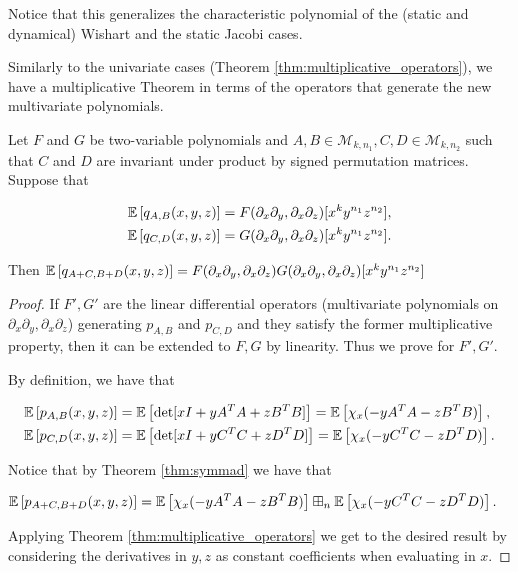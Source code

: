     Notice that this generalizes the characteristic polynomial of the (static and dynamical) Wishart and the static Jacobi cases. 

    Similarly to the univariate cases (Theorem \ref{thm:multiplicative_operators}), we have a multiplicative Theorem in terms of the operators that generate the new multivariate polynomials.

    \begin{theorem} \label{thm:multivariate_operators}
        Let $F$ and $G$ be two-variable polynomials and $A,B \in \mathcal M_{k,n_1}, C,D \in \mathcal M_{k,n_2}$ such that $C$ and $D$ are invariant under product by signed permutation matrices. Suppose that

         \begin{align*}
            \mathbb E \left[ q_{A,B}(x,y,z) \right] &= F(\partial_x \partial_y,\partial_x\partial_z)[x^ky^{n_1}z^{n_2}],\\ 
            \mathbb E \left[ q_{C,D}(x,y,z) \right] &= G(\partial_x \partial_y,\partial_x\partial_z)[x^ky^{n_1}z^{n_2}].
         \end{align*}

         Then $\mathbb E \left[ q_{A+C, B+D}(x,y,z) \right] = F(\partial_x \partial_y,\partial_x\partial_z)G(\partial_x \partial_y,\partial_x\partial_z)[x^ky^{n_1}z^{n_2}]$
    \end{theorem}

    \begin{proof}
        If $F',G'$ are the linear differential operators (multivariate polynomials on $\partial_x\partial_y, \partial_x\partial_z$) generating $p_{A,B}$ and $p_{C,D}$ and they satisfy the former multiplicative property, then it can be extended to $F,G$ by linearity. Thus we prove for $F', G'$. 


        By definition, we have that 
        
        \begin{align*}
            \mathbb E \left[  p_{A, B}(x,y,z)  \right] &= \mathbb E \left[  \det[ x I + y A^T A + z B^TB ]  \right] = \mathbb E \left[ \chi_x(-yA^TA -zB^TB) \right],\\
            \mathbb E \left[  p_{C, D}(x,y,z)  \right] &= \mathbb E \left[  \det[ x I + y C^TC + z D^TD ]  \right] = \mathbb E \left[ \chi_x(-yC^TC -zD^TD) \right].
        \end{align*}

        Notice that by Theorem \ref{thm:symmad} we have that

        \begin{align*}
            \mathbb E \left[ p_{A+C, B+D}(x,y,z) \right] &= \mathbb E \left[ \chi_x(-yA^TA -zB^TB) \right] \boxplus_n \mathbb E \left[ \chi_x(-yC^TC -zD^TD) \right].
        \end{align*}

        Applying Theorem \ref{thm:multiplicative_operators} we get to the desired result by considering the derivatives in $y,z$ as constant coefficients when evaluating in $x$.
    \end{proof}

